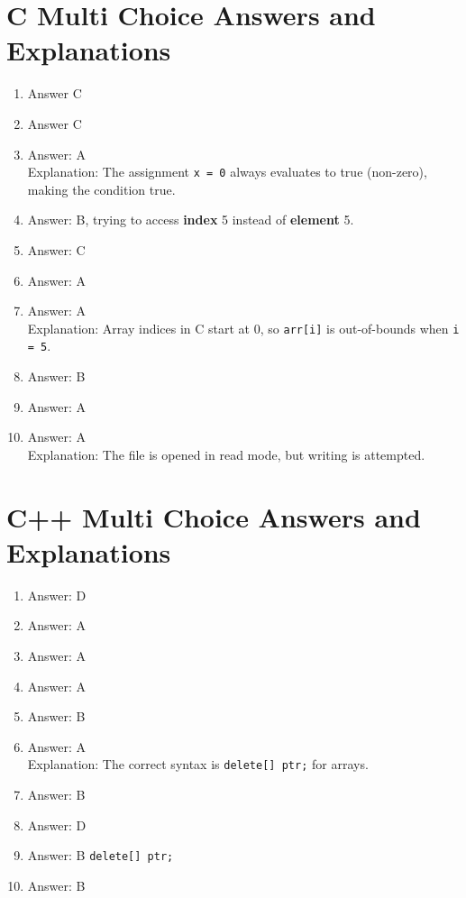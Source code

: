 \documentclass[a4paper,12pt]{article}
\begin{document}
\pagestyle{empty}

\section{C Multi Choice Answers and Explanations}

\begin{enumerate}
    \item Answer C
    \item Answer C
    \item Answer: A\\
    Explanation: The assignment \verb|x = 0| always evaluates to true (non-zero), making the condition true.
    \item Answer: B, trying to access \textbf{index} 5 instead of \textbf{element} 5.
    \item Answer: C
    \item Answer: A
    \item Answer: A\\
    Explanation: Array indices in C start at 0, so \verb|arr[i]| is out-of-bounds when \verb|i = 5|.
    \item Answer: B
    \item Answer: A
    \item Answer: A\\
    Explanation: The file is opened in read mode, but writing is attempted.
\end{enumerate}

\section{C++ Multi Choice Answers and Explanations}

\begin{enumerate}
    \item Answer: D
    \item Answer: A
    \item Answer: A
    \item Answer: A
    \item Answer: B
    \item Answer: A\\
    Explanation: The correct syntax is \verb|delete[] ptr;| for arrays.
    \item Answer: B
    \item Answer: D
    \item Answer: B \verb|delete[] ptr;|
    \item Answer: B
\end{enumerate}
\end{document}
